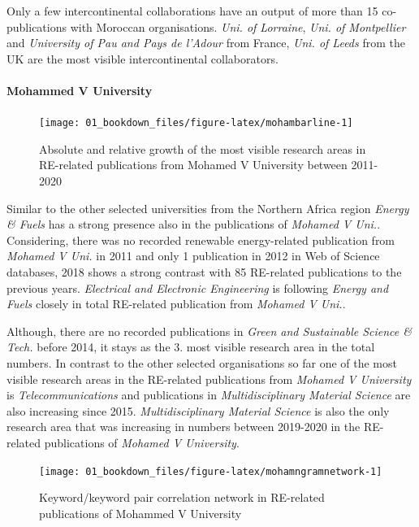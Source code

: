 \documentclass[
]{book}
\begin{document}
Only a few intercontinental collaborations have an output of more than 15 co-publications with Moroccan organisations. \emph{Uni. of Lorraine}, \emph{Uni. of Montpellier} and \emph{University of Pau and Pays de l'Adour} from France, \emph{Uni. of Leeds} from the UK are the most visible intercontinental collaborators.

\hypertarget{mohammed-v-university}{%
\paragraph{Mohammed V University}\label{mohammed-v-university}}

\begin{figure}
\texttt{[image: 01\_bookdown\_files/figure-latex/mohambarline-1]} \caption{Absolute and relative growth of the most visible research areas in RE-related publications from Mohamed V University between 2011-2020}\label{fig:mohambarline}
\end{figure}

Similar to the other selected universities from the Northern Africa region \emph{Energy \& Fuels} has a strong presence also in the publications of \emph{Mohamed V Uni.}. Considering, there was no recorded renewable energy-related publication from \emph{Mohamed V Uni.} in 2011 and only 1 publication in 2012 in Web of Science databases, 2018 shows a strong contrast with 85 RE-related publications to the previous years. \emph{Electrical and Electronic Engineering} is following \emph{Energy and Fuels} closely in total RE-related publication from \emph{Mohamed V Uni.}.

Although, there are no recorded publications in \emph{Green and Sustainable Science \& Tech.} before 2014, it stays as the 3. most visible research area in the total numbers. In contrast to the other selected organisations so far one of the most visible research areas in the RE-related publications from \emph{Mohamed V University} is \emph{Telecommunications} and publications in \emph{Multidisciplinary Material Science} are also increasing since 2015. \emph{Multidisciplinary Material Science} is also the only research area that was increasing in numbers between 2019-2020 in the RE-related publications of \emph{Mohamed V University}.

\begin{figure}
\texttt{[image: 01\_bookdown\_files/figure-latex/mohamngramnetwork-1]} \caption{Keyword/keyword pair correlation network in RE-related publications of Mohammed V University}\label{fig:mohamngramnetwork}
\end{figure}
\end{document}

